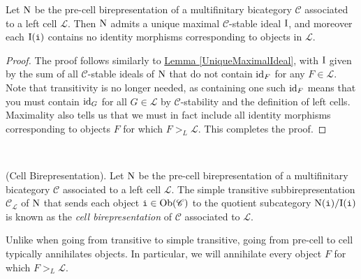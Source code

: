 \noindent\begin{proposition}\label{UniqueMaximalIdealCell} Let $\textup{N}$ be the pre-cell birepresentation of a multifinitary bicategory $\mathscr{C}$ associated to a left cell $\mathcal{L}$. Then $\textup{N}$ admits a unique maximal $\mathscr{C}$-stable ideal $\textup{I}$, and moreover each $\textup{I}(\textup{\texttt{i}})$ contains no identity morphisms corresponding to objects in $\mathcal{L}$.\\
\end{proposition}

\noindent\begin{proof} The proof follows similarly to \hyperref[UniqueMaximalIdeal]{Lemma \ref*{UniqueMaximalIdeal}}, with $\textup{I}$ given by the sum of all $\mathscr{C}$-stable ideals of $\textup{N}$ that do not contain $\textup{id}_F$ for any $F \in \mathcal{L}$. Note that transitivity is no longer needed, as containing one such $\textup{id}_F$ means that you must contain $\textup{id}_G$ for all $G \in \mathcal{L}$ by $\mathscr{C}$-stability and the definition of left cells. Maximality also tells us that we must in fact include all identity morphisms corresponding to objects $F$ for which $F >_L \mathcal{L}$. This completes the proof.
\end{proof}\\

\noindent\begin{definition}\textup{(Cell Birepresentation).} Let $\textup{N}$ be the pre-cell birepresentation of a multifinitary bicategory $\mathscr{C}$ associated to a left cell $\mathcal{L}$. The simple transitive subbirepresentation $\mathscr{C}_\mathcal{L}$ of $\textup{N}$ that sends each object $\textup{\texttt{i}} \in \textup{Ob}(\mathscr{C})$ to the quotient subcategory $\textup{N}(\textup{\texttt{i}})/\textup{I}(\textup{\texttt{i}})$ is known as the {\em cell birepresentation} of $\mathscr{C}$ associated to $\mathcal{L}$.\\
\end{definition}

\noindent Unlike when going from transitive to simple transitive, going from pre-cell to cell typically annihilates objects. In particular, we will annihilate every object $F$ for which $F >_L \mathcal{L}$.\newpage


